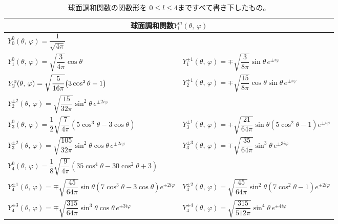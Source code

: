 \documentclass[../../master.tex]{subfiles}
\begin{document}
\begin{table}[h]
	\centering
	\caption{球面調和関数の関数形を
		\(0\leq l \leq 4\)まですべて書き下したもの。}
	\begin{tabular}[t]{ll}
		\hline
		\multicolumn{2}{c}{球面調和関数\(Y_l^m(\theta,\,\varphi)\)}                                                                 \\
		\hline \hline
		\(Y_0^{0}(\theta,\,\varphi)=\dfrac{1}{\sqrt{4\pi}}\) &
		\rule[-5mm]{0mm}{12mm}                                                                                                \\
		\(Y_1^{0}(\theta,\,\varphi) =\sqrt{\dfrac{3}{4\pi}}\cos\theta\)                                &
		\(Y_1^{\pm 1}(\theta,\,\varphi) =\mp\sqrt{\dfrac{3}{8\pi}}\sin\theta \,e^{\pm i\varphi}\)
		\rule[-5mm]{0mm}{10mm}                                                                                                \\
		\(Y_2^{0}(\theta,\,\varphi) =\sqrt{\dfrac{5}{16\pi}}\qty(3\cos^2\theta-1)\)                    &
		\(Y_2^{\pm 1}(\theta,\,\varphi) =\mp\sqrt{\dfrac{15}{8\pi}}\cos\theta\sin\theta \,e^{\pm i\varphi}\)
		\rule[-5mm]{0mm}{10mm}                                                                                                \\
		\(Y_2^{\pm 2}(\theta,\,\varphi) =\sqrt{\dfrac{15}{32\pi}}\sin^2\theta \,e^{\pm 2 i\varphi}\)&
		\rule[-5mm]{0mm}{10mm}                                                                                                \\
		\(Y_3^0(\theta,\,\varphi) =\dfrac{1}{2}\sqrt{\dfrac{7}{4\pi}}(5\cos^3\theta-3\cos\theta)\) &
		\(Y_3^{\pm 1}(\theta,\,\varphi) =\mp\sqrt{\dfrac{21}{64\pi}}\sin\theta(5\cos^2\theta-1) e^{\pm i\varphi}\)
		\rule[-5mm]{0mm}{10mm}\\
		\(Y_3^{\pm 2}(\theta,\,\varphi) =\sqrt{\dfrac{105}{32\pi}}\sin^2\theta\cos\theta \,e^{\pm 2i\varphi}\) &
		\(Y_3^{\pm 3}(\theta,\,\varphi) =\mp\sqrt{\dfrac{35}{64\pi}}\sin^3\theta \,e^{\pm 3i\varphi}\)
		\rule[-5mm]{0mm}{10mm}\\
		\(Y_4^0(\theta,\,\varphi) =\dfrac{1}{8}\sqrt{\dfrac{9}{4\pi}}(35\cos^4\theta-30\cos^2\theta+3)\) &
		\rule[-5mm]{0mm}{10mm}\\
		\(Y_4^{\pm 1}(\theta,\,\varphi) =\mp\sqrt{\dfrac{45}{64\pi}}\sin\theta(7\cos^3\theta-3\cos\theta) e^{\pm 2i\varphi}\)&
		\(Y_4^{\pm 2}(\theta,\,\varphi) =\sqrt{\dfrac{45}{64\pi}}\sin^2\theta(7\cos^2\theta-1) e^{\pm 2i\varphi}\)
		\rule[-5mm]{0mm}{10mm}\\
		\(Y_4^{\pm 3}(\theta,\,\varphi) =\mp\sqrt{\dfrac{315}{64\pi}}\sin^3\theta\cos\theta \,e^{\pm 3i\varphi}\) &
		\(Y_4^{\pm 4}(\theta,\,\varphi) =\sqrt{\dfrac{315}{512\pi}}\sin^4\theta \,e^{\pm 4i\varphi}\)
		\rule[-5mm]{0mm}{10mm}\\
		\hline
	\end{tabular}
	\renewcommand{\arraystretch}{1.0}
\end{table}
\end{document}

